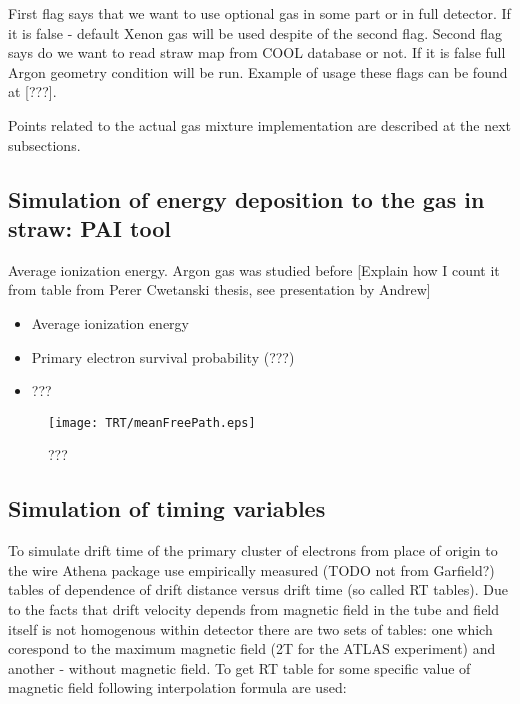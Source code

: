 First flag says that we want to use optional gas in some part or in full detector. If it is false - default Xenon gas will be used despite of the second flag. 
Second flag says do we want to read straw map from COOL database or not.
If it is false full Argon geometry condition will be run. Example of usage these flags can be found at [???].

Points related to the actual gas mixture implementation are described at the next subsections.

\subsection{Simulation of energy deposition to the gas in straw: PAI tool}


Average ionization energy. Argon gas was studied before   [Explain how I count it from table from Perer Cwetanski thesis, see presentation by Andrew]




\begin{itemize}
 \item Average ionization energy
 \item Primary electron survival probability (???)
 \item ???
\end{itemize}



\begin{figure}
\begin{center}
 \texttt{[image: TRT/meanFreePath.eps]}
\caption{\label{fig:meanFreePath} ???}
\end{center}
\end{figure}


\subsection{Simulation of timing variables}

To simulate drift time of the primary cluster of electrons from place of origin to the wire Athena package 
use empirically measured (TODO not from Garfield?) tables of dependence of drift distance versus drift time (so called RT tables). 
Due to the facts that drift velocity depends from magnetic field in the tube and field itself is not homogenous within detector 
there are two sets of tables: one which corespond to the maximum magnetic field (2T for the ATLAS experiment) and another - without magnetic field. To get RT table
for some specific value of magnetic field following interpolation formula are used:

